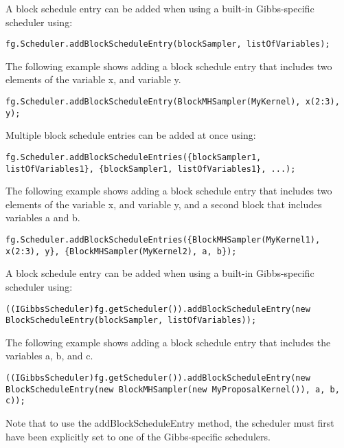 \ifmatlab
A block schedule entry can be added when using a built-in Gibbs-specific scheduler using:
\begin{lstlisting}
fg.Scheduler.addBlockScheduleEntry(blockSampler, listOfVariables);
\end{lstlisting}

The following example shows adding a block schedule entry that includes two elements of the variable x, and variable y.

\begin{lstlisting}
fg.Scheduler.addBlockScheduleEntry(BlockMHSampler(MyKernel), x(2:3), y);
\end{lstlisting}


Multiple block schedule entries can be added at once using:
\begin{lstlisting}
fg.Scheduler.addBlockScheduleEntries({blockSampler1, listOfVariables1}, {blockSampler1, listOfVariables1}, ...);
\end{lstlisting}

The following example shows adding a block schedule entry that includes two elements of the variable x, and variable y, and a second block that includes variables a and b.

\begin{lstlisting}
fg.Scheduler.addBlockScheduleEntries({BlockMHSampler(MyKernel1), x(2:3), y}, {BlockMHSampler(MyKernel2), a, b});
\end{lstlisting}

\fi

\ifjava
A block schedule entry can be added when using a built-in Gibbs-specific scheduler using:

\begin{lstlisting}
((IGibbsScheduler)fg.getScheduler()).addBlockScheduleEntry(new BlockScheduleEntry(blockSampler, listOfVariables));
\end{lstlisting}

The following example shows adding a block schedule entry that includes the variables a, b, and c.

\begin{lstlisting}
((IGibbsScheduler)fg.getScheduler()).addBlockScheduleEntry(new BlockScheduleEntry(new BlockMHSampler(new MyProposalKernel()), a, b, c));
\end{lstlisting}

Note that to use the addBlockScheduleEntry method, the scheduler must first have been explicitly set to one of the Gibbs-specific schedulers.
\fi

